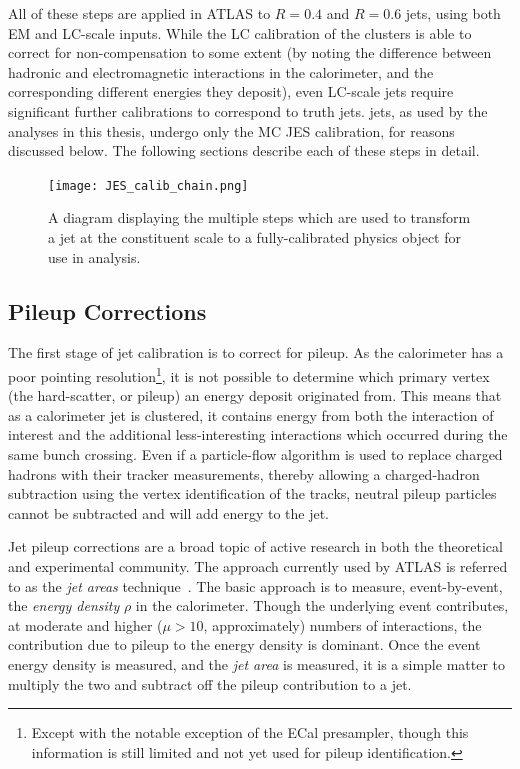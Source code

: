 All of these steps are applied in ATLAS to $R=0.4$ and $R=0.6$ jets, using both EM and LC-scale inputs. While the LC calibration of the clusters is able to correct for non-compensation to some extent (by noting the difference between hadronic and electromagnetic interactions in the calorimeter, and the corresponding different energies they deposit), even LC-scale jets require significant further calibrations to correspond to truth jets. \LargeR jets, as used by the analyses in this thesis, undergo only the MC JES calibration, for reasons discussed below. The following sections describe each of these steps in detail.


\begin{figure}
\centering
\texttt{[image: JES\_calib\_chain.png]}
\label{fig:jet-reconstruction:making-jets}
\caption{A diagram displaying the multiple steps which are used to transform a jet at the constituent scale to a fully-calibrated physics object for use in analysis.}
\end{figure}


\subsection{Pileup Corrections}

The first stage of jet calibration is to correct for pileup. As the calorimeter has a poor pointing resolution\footnote{Except with the notable exception of the ECal presampler, though this information is still limited and not yet used for pileup identification.}, it is not possible to determine which primary vertex (the hard-scatter, or pileup) an energy deposit originated from. This means that as a calorimeter jet is clustered, it contains energy from both the interaction of interest and the additional less-interesting interactions which occurred during the same bunch crossing. Even if a particle-flow algorithm is used to replace charged hadrons with their tracker measurements, thereby allowing a charged-hadron subtraction using the vertex identification of the tracks, neutral pileup particles cannot be subtracted and will add energy to the jet. 

Jet pileup corrections are a broad topic of active research in both the theoretical and experimental community.  The approach currently used by ATLAS is referred to as the \textit{jet areas} technique~\cite{jetareas}. The basic approach is to measure, event-by-event, the \textit{energy density} $\rho$ in the calorimeter. Though the underlying event contributes, at moderate and higher ($\mu > 10$, approximately) numbers of interactions, the contribution due to pileup to the energy density is dominant. Once the event energy density is measured, and the \textit{jet area} is measured, it is a simple matter to multiply the two and subtract off the pileup contribution to a jet.

